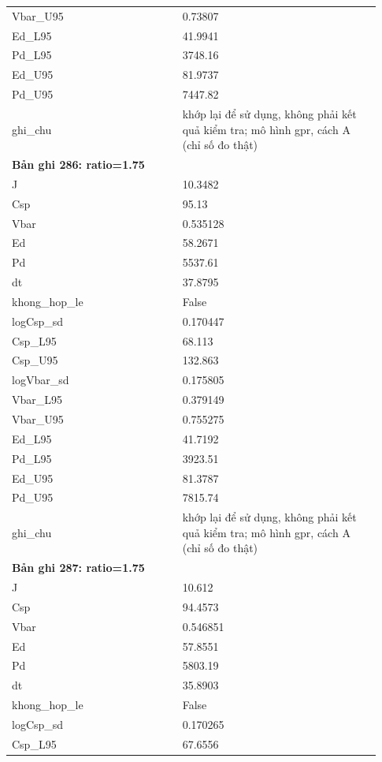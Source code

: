 \begin{longtable}{p{0.43\linewidth}p{0.50\linewidth}}
Vbar\_\allowbreak U95 & 0.73807 \\
Ed\_\allowbreak L95 & 41.9941 \\
Pd\_\allowbreak L95 & 3748.16 \\
Ed\_\allowbreak U95 & 81.9737 \\
Pd\_\allowbreak U95 & 7447.82 \\
ghi\_\allowbreak chu & khớp lại để sử dụng, không phải kết quả kiểm tra; mô hình gpr, cách A (chỉ số đo thật) \\
\midrule
\multicolumn{2}{p{0.95\linewidth}}{\textbf{Bản ghi 286: ratio=1.75}} \\
J & 10.3482 \\
Csp & 95.13 \\
Vbar & 0.535128 \\
Ed & 58.2671 \\
Pd & 5537.61 \\
dt & 37.8795 \\
khong\_\allowbreak hop\_\allowbreak le & False \\
logCsp\_\allowbreak sd & 0.170447 \\
Csp\_\allowbreak L95 & 68.113 \\
Csp\_\allowbreak U95 & 132.863 \\
logVbar\_\allowbreak sd & 0.175805 \\
Vbar\_\allowbreak L95 & 0.379149 \\
Vbar\_\allowbreak U95 & 0.755275 \\
Ed\_\allowbreak L95 & 41.7192 \\
Pd\_\allowbreak L95 & 3923.51 \\
Ed\_\allowbreak U95 & 81.3787 \\
Pd\_\allowbreak U95 & 7815.74 \\
ghi\_\allowbreak chu & khớp lại để sử dụng, không phải kết quả kiểm tra; mô hình gpr, cách A (chỉ số đo thật) \\
\midrule
\multicolumn{2}{p{0.95\linewidth}}{\textbf{Bản ghi 287: ratio=1.75}} \\
J & 10.612 \\
Csp & 94.4573 \\
Vbar & 0.546851 \\
Ed & 57.8551 \\
Pd & 5803.19 \\
dt & 35.8903 \\
khong\_\allowbreak hop\_\allowbreak le & False \\
logCsp\_\allowbreak sd & 0.170265 \\
Csp\_\allowbreak L95 & 67.6556 \\

\end{longtable}
